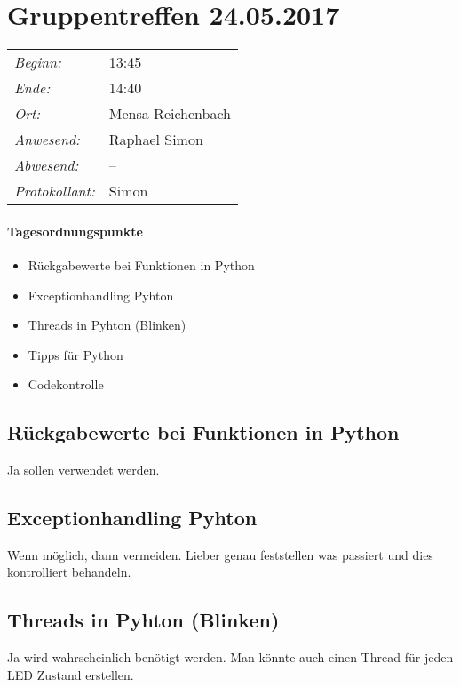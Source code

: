 \documentclass{scrartcl}
\date{24.05.2017}	%
\begin{document}
\maketitle
\section{Gruppentreffen 24.05.2017}	%
\begin{tabular}[t]{p{.25\linewidth} p{.25\linewidth}}
\emph{Beginn:}				& 13:45\\
\emph{Ende:}					& 14:40\\
\emph{Ort:}						& Mensa Reichenbach\\
\emph{Anwesend:}	& 
Raphael\newline
Simon
\\
\emph{Abwesend:}		 & 
--
\\
\emph{Protokollant:}& Simon
\end{tabular}
\paragraph{Tagesordnungspunkte}
\begin{itemize}
\item Rückgabewerte bei Funktionen in Python
\item Exceptionhandling Pyhton
\item Threads in Pyhton (Blinken)
\item Tipps für Python
\item Codekontrolle
\end{itemize}

\subsection{Rückgabewerte bei Funktionen in Python}
Ja sollen verwendet werden.

\subsection{Exceptionhandling Pyhton}
Wenn möglich, dann vermeiden. Lieber genau feststellen was passiert und dies kontrolliert behandeln.

\subsection{Threads in Pyhton (Blinken)}
Ja wird wahrscheinlich benötigt werden. Man könnte auch einen Thread für jeden LED Zustand erstellen.
\end{document}
